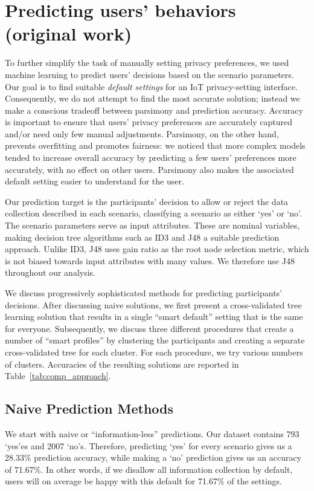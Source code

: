 \section{Predicting users' behaviors (original work)}\label{sec:predict1}
To further simplify the task of manually setting privacy preferences, we used machine learning to predict users' decisions based on the scenario parameters. Our goal is to find suitable \emph{default settings} for an IoT privacy-setting interface. Consequently, we do not attempt to find the most accurate solution; instead we make a conscious tradeoff between parsimony and prediction accuracy. Accuracy is important to ensure that users' privacy preferences are accurately captured and/or need only few manual adjustments. Parsimony, on the other hand, prevents overfitting and promotes fairness: we noticed that more complex models tended to increase overall accuracy by predicting a few users' preferences more accurately, with no effect on other users. Parsimony also makes the associated default setting easier to understand for the user. 

Our prediction target is the participants' decision to allow or reject the data collection described in each scenario, classifying a scenario as either `yes' or `no'. The scenario parameters serve as input attributes. These are nominal variables, making decision tree algorithms such as ID3 and J48 a suitable prediction approach. Unlike ID3, J48 uses gain ratio as the root node selection metric, which is not biased towards input attributes with many values. We therefore use J48 throughout our analysis.

We discuss progressively sophisticated methods for predicting participants' decisions. After discussing naive solutions, we first present a cross-validated tree learning solution that results in a single ``smart default'' setting that is the same for everyone. Subsequently, we discuss three different procedures that create a number of ``smart profiles'' by clustering the participants and creating a separate cross-validated tree for each cluster. For each procedure, we try various numbers of clusters. Accuracies of the resulting solutions are reported in Table~\ref{tab:comp_approach}.

\subsection{Naive Prediction Methods}
We start with naive or ``information-less'' predictions. Our dataset contains 793 `yes'es and 2007 `no's. Therefore, predicting `yes' for every scenario gives us a 28.33\% prediction accuracy, while making a `no' prediction gives us an accuracy of 71.67\%. In other words, if we disallow all information collection by default, users will on average be happy with this default for 71.67\% of the settings.



